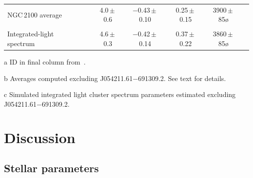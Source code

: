 \begin{table}
\begin{center}
\begin{threeparttable}
\begin{tabular}{lc ccccl}
\\
NGC\,2100 average\tnote{b} & & 4.0\,$\pm$\,0.6 & $-$0.43\,$\pm$\,0.10 & 0.25\,$\pm$\,0.15 & 3900\,$\pm$\,85\o\\
\\
Integrated-light spectrum\tnote{c}             & & 4.6\,$\pm$\,0.3 & $-$0.42\,$\pm$\,0.14 & 0.37\,$\pm$\,0.22 & 3860\,$\pm$\,85\o\\
  \hline
  \end{tabular}
\begin{tablenotes}
    \item [a] ID in final column from{~\cite{1974A&AS...15..261R}}.
    \item [b] Averages computed excluding J054211.61$-$691309.2. See text for details.
    \item [c] Simulated integrated light cluster spectrum parameters estimated excluding J054211.61$-$691309.2.
\end{tablenotes}
  \end{threeparttable}
  \end{center}
\end{table}


\section{Discussion} %
\label{sec:discussion}

\subsection{Stellar parameters} %
\label{sub:stellar_parameters_disc}

